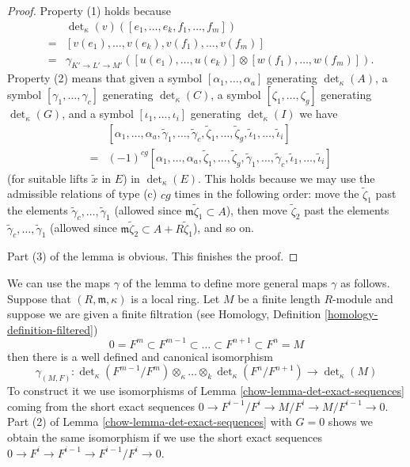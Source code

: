 \begin{proof}
\medskip\noindent
Property (1) holds because
\begin{eqnarray*}
& & \det\nolimits_\kappa(v)([e_1, \ldots, e_k, f_1, \ldots, f_m]) \\
& = &
[v(e_1), \ldots, v(e_k), v(f_1), \ldots, v(f_m)] \\
& = &
\gamma_{K' \to L' \to M'}([u(e_1), \ldots, u(e_k)]
\otimes [w(f_1), \ldots, w(f_m)]).
\end{eqnarray*}
Property (2) means that given a symbol
$[\alpha_1, \ldots, \alpha_a]$ generating $\det_\kappa(A)$,
a symbol $[\gamma_1, \ldots, \gamma_c]$ generating $\det_\kappa(C)$,
a symbol $[\zeta_1, \ldots, \zeta_g]$ generating $\det_\kappa(G)$, and
a symbol $[\iota_1, \ldots, \iota_i]$ generating $\det_\kappa(I)$
we have
\begin{eqnarray*}
& & [\alpha_1, \ldots, \alpha_a, \tilde\gamma_1, \ldots, \tilde\gamma_c,
\tilde\zeta_1, \ldots, \tilde\zeta_g, \tilde\iota_1, \ldots, \tilde\iota_i] \\
& = &
(-1)^{cg} [\alpha_1, \ldots, \alpha_a, \tilde\zeta_1, \ldots, \tilde\zeta_g,
\tilde\gamma_1, \ldots, \tilde\gamma_c, \tilde\iota_1, \ldots, \tilde\iota_i]
\end{eqnarray*}
(for suitable lifts $\tilde{x}$ in $E$) in $\det_\kappa(E)$.
This holds because we may use the admissible relations of type (c)
$cg$ times in the following order: move the
$\tilde\zeta_1$ past the elements
$\tilde\gamma_c, \ldots, \tilde\gamma_1$
(allowed since $\mathfrak m\tilde\zeta_1 \subset A$),
then move $\tilde\zeta_2$ past the elements
$\tilde\gamma_c, \ldots, \tilde\gamma_1$
(allowed since $\mathfrak m\tilde\zeta_2 \subset A + R\tilde\zeta_1$),
and so on.

\medskip\noindent
Part (3) of the lemma is obvious.
This finishes the proof.
\end{proof}

We can use the maps $\gamma$ of the lemma to define more general maps
$\gamma$ as follows. Suppose that $(R, \mathfrak m, \kappa)$ is a
local ring. Let $M$ be a finite length $R$-module and suppose we
are given a finite filtration (see
Homology, Definition \ref{homology-definition-filtered})
$$
0 = F^m \subset F^{m - 1} \subset \ldots \subset F^{n + 1} \subset F^n = M
$$
then there is a well defined and canonical isomorphism
$$
\gamma_{(M, F)} :
\det\nolimits_\kappa(F^{m - 1}/F^m) \otimes_\kappa \ldots \otimes_k
\det\nolimits_\kappa(F^n/F^{n + 1})
\longrightarrow
\det\nolimits_\kappa(M)
$$
To construct it we use isomorphisms of Lemma \ref{chow-lemma-det-exact-sequences}
coming from the short exact sequences
$0 \to F^{i - 1}/F^i \to M/F^i \to M/F^{i - 1} \to 0$.
Part (2) of Lemma \ref{chow-lemma-det-exact-sequences} with $G = 0$ shows
we obtain the same isomorphism if we use the short exact sequences
$0 \to F^i \to F^{i - 1} \to F^{i - 1}/F^i \to 0$.

